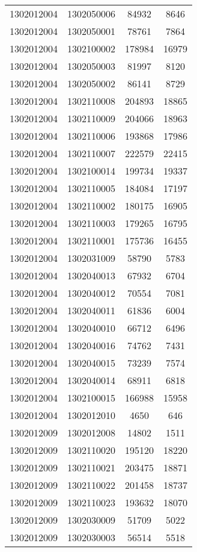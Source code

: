 \begin{longtable}[h]{llcc}
		1302012004 & 1302050006 & 84932 & 8646\\
		1302012004 & 1302050001 & 78761 & 7864\\
		1302012004 & 1302100002 & 178984 & 16979\\
		1302012004 & 1302050003 & 81997 & 8120\\
		1302012004 & 1302050002 & 86141 & 8729\\
		1302012004 & 1302110008 & 204893 & 18865\\
		1302012004 & 1302110009 & 204066 & 18963\\
		1302012004 & 1302110006 & 193868 & 17986\\
		1302012004 & 1302110007 & 222579 & 22415\\
		1302012004 & 1302100014 & 199734 & 19337\\
		1302012004 & 1302110005 & 184084 & 17197\\
		1302012004 & 1302110002 & 180175 & 16905\\
		1302012004 & 1302110003 & 179265 & 16795\\
		1302012004 & 1302110001 & 175736 & 16455\\
		1302012004 & 1302031009 & 58790 & 5783\\
		1302012004 & 1302040013 & 67932 & 6704\\
		1302012004 & 1302040012 & 70554 & 7081\\
		1302012004 & 1302040011 & 61836 & 6004\\
		1302012004 & 1302040010 & 66712 & 6496\\
		1302012004 & 1302040016 & 74762 & 7431\\
		1302012004 & 1302040015 & 73239 & 7574\\
		1302012004 & 1302040014 & 68911 & 6818\\
		1302012004 & 1302100015 & 166988 & 15958\\
		1302012004 & 1302012010 & 4650 & 646\\
		1302012009 & 1302012008 & 14802 & 1511\\
		1302012009 & 1302110020 & 195120 & 18220\\
		1302012009 & 1302110021 & 203475 & 18871\\
		1302012009 & 1302110022 & 201458 & 18737\\
		1302012009 & 1302110023 & 193632 & 18070\\
		1302012009 & 1302030009 & 51709 & 5022\\
		1302012009 & 1302030003 & 56514 & 5518\\

\end{longtable}

